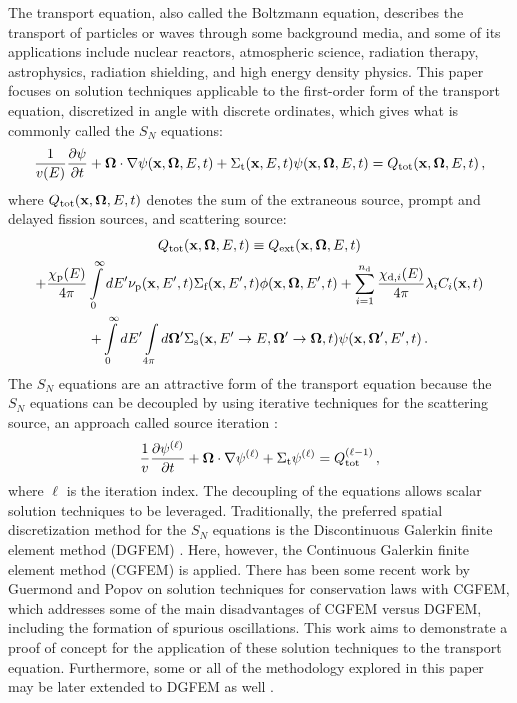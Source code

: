 The transport equation, also called the Boltzmann equation, describes the
transport of particles or waves through some background media, and some
of its applications include nuclear reactors, atmospheric science, radiation
therapy, astrophysics, radiation shielding, and high energy density physics.
This paper focuses on solution techniques applicable to the first-order
form of the transport equation, discretized in angle with discrete ordinates,
which gives what is commonly called the $S_N$ equations:
\begin{equation}\label{eq:transport_scalar}
  \frac{1}{v(E)}\frac{\partial \psi}{\partial t} + \mathbf{\Omega}\cdot\nabla\psi(\mathbf{x},\mathbf{\Omega},E,t)
    + \Sigma_\textup{t}(\mathbf{x},E,t)\psi(\mathbf{x},\mathbf{\Omega},E,t) = Q_\textup{tot}(\mathbf{x},\mathbf{\Omega},E,t)
  \,,
\end{equation}
where $Q_\textup{tot}(\mathbf{x},\mathbf{\Omega},E,t)$ denotes the sum of the extraneous source, prompt and delayed
fission sources, and scattering source:
\begin{multline}
  Q_\textup{tot}(\mathbf{x},\mathbf{\Omega},E,t) \equiv Q_\textup{ext}(\mathbf{x},\mathbf{\Omega},E,t)\\
    + \frac{\chi_\text{p}(E)}{4\pi}\int\limits_0^\infty
      dE'\nu_\text{p}(\mathbf{x},E',t)\Sigma_\textup{f}(\mathbf{x},E',t)\phi(\mathbf{x},\mathbf{\Omega},E',t)
    + \sum\limits_{i=1}^{n_\text{d}}\frac{\chi_{\text{d},i}(E)}{4\pi}\lambda_i C_i(\mathbf{x},t)\\
    + \int\limits_0^\infty dE'\int\limits_{4\pi}d\mathbf{\Omega}'
      \Sigma_\textup{s}(\mathbf{x},E'\rightarrow E,\mathbf{\Omega}'\rightarrow\mathbf{\Omega},t)\psi(\mathbf{x},\mathbf{\Omega}',E',t)
  \,.
\end{multline}
The $S_N$ equations are an attractive form of the transport equation because
the $S_N$ equations can be decoupled by using iterative techniques for the
scattering source, an approach called source iteration \cite{glasstone}:
\begin{equation}
  \frac{1}{v}\frac{\partial \psi^{(\ell)}}{\partial t}
    + \mathbf{\Omega}\cdot\nabla\psi^{(\ell)}
    + \Sigma_\textup{t}\psi^{(\ell)} = Q_\textup{tot}^{(\ell-1)} \,,
\end{equation}
where $\ell$ is the iteration index. The decoupling of the equations allows
scalar solution techniques to be leveraged.
Traditionally, the preferred spatial discretization method for the $S_N$
equations is the Discontinuous Galerkin finite element method (DGFEM)
\cite{Lesaint1974}\cite{Reed_Hill_1973}. Here, however, the
Continuous Galerkin finite element method (CGFEM) is applied. There
has been some recent work by Guermond and Popov \cite{guermond_ev} on
solution techniques for conservation laws with CGFEM, which addresses some
of the main disadvantages of CGFEM versus DGFEM, including the formation
of spurious oscillations. This work aims to demonstrate a proof of concept
for the application of these solution techniques to the transport equation.
Furthermore, some or all of the methodology explored in this paper may be
later extended to DGFEM as well \cite{zingan_2013}.

